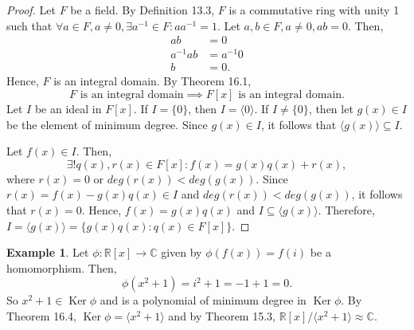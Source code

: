 \documentclass{article}
\newtheorem{theorem}{Theorem}[section]
\theoremstyle{definition}
\newtheorem{example}{Example}[section]
\DeclareMathOperator{\Ker}{Ker}
\begin{document}
\begin{proof}
      Let $F$ be a field. By Definition 13.3, $F$ is a commutative ring with unity 1 such that $\forall a\in F, a\neq0, \exists a^{-1}\in F: aa^{-1}=1$. Let $a,b\in F, a\neq0, ab=0$. Then,
      \begin{align*}
          ab&=0 \\
          a^{-1}ab&=a^{-1}0 \\
          b&=0.
      \end{align*}
      Hence, $F$ is an integral domain. By Theorem 16.1,
      \begin{equation*}
          F \text{ is an integral domain} \implies F[x] \text{ is an integral domain.}
      \end{equation*}
      Let $I$ be an ideal in $F[x]$. If $I=\{0\}$, then $I=\langle 0\rangle$. If $I\neq\{0\}$, then let $g(x)\in I$ be the element of minimum degree. Since $g(x)\in I$, it follows that $\langle g(x)\rangle \subseteq I$. 
      
      Let $f(x)\in I$. Then,
      \begin{equation*}
          \exists! q(x),r(x)\in F[x]: f(x)=g(x)q(x)+r(x),
      \end{equation*}
      where $r(x)=0$ or $deg(r(x))<deg(g(x))$. Since $r(x)=f(x)-g(x)q(x) \in I$ and $deg(r(x))<deg(g(x))$, it follows that $r(x)=0$. Hence, $f(x)=g(x)q(x)$ and $I \subseteq \langle g(x) \rangle$. Therefore, $I=\langle g(x)\rangle=\{g(x)q(x):q(x)\in F[x]\}$.
\end{proof}

\noindent{}

\begin{example}
    Let $\phi: \mathbb{R}[x]\to \mathbb{C}$ given by $\phi(f(x))=f(i)$ be a homomorphism. Then,
    \begin{equation*}
        \phi(x^2+1)=i^2+1=-1+1=0.
    \end{equation*}
    So $x^2+1\in\Ker\phi$ and is a polynomial of minimum degree in  $\Ker\phi$. By Theorem 16.4, $\Ker\phi=\langle x^2+1 \rangle$ and by Theorem 15.3, $\mathbb{R}[x]/\langle x^2+1 \rangle \approx \mathbb{C}$. 
\end{example}
\end{document}
